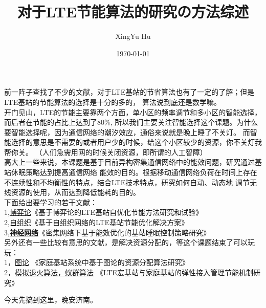 \documentclass{article}
\author{XingYu Hu}
\title{对于LTE节能算法的研究の方法综述}
\date{\today}
\begin{document}
\maketitle
前一阵子查找了不少的文献，对于LTE基站的节省算法也有了一定的了解；但是LTE基站的节能算法的选择是十分的多的，
算法说到底还是数学嘛。\\

开门见山，LTE的节能主要靠两个方面，单小区的频率调节和多小区的智能选择，而后者在节能的占比上达到了80\%,
所以我们主要关注智能选择这个课题。为什么要智能选择呢，因为通信网络的潮汐效应，通俗来说就是晚上睡了不关灯。
而智能选择的意思是不需要的或者用户少的时候，给这个小区较少的资源，你不关灯我帮你关。
（人们急需用网的时候关闭资源，即所谓的人工智障）\\


高大上一些来说，本课题是基于目前异构密集通信网络中的能效问题，研究通过基站休眠策略达到提高通信网络
能效的目的。根据移动通信网络负荷在时间上存在不连续性和不均衡性的特点，结合LTE技术特点，研究如何自动、动态地
调节无线资源的使用，从而达到降低能耗的目的。\\

下面给出要学习的若干文献：\\
1,\underline{博弈论}《基于博弈论的LTE基站自优化节能方法研究和试验》\\
2,\underline{自组织}《基于自组织网络的LTE基站节能优化解决方案》\\
3,\underline{\textbf{神经网络}}《密集网络下基于能效优化的基站睡眠控制策略研究》\\

另外还有一些比较有意思的文献，是解决资源分配的，等这个课题结束了可以玩玩：\\
1，\underline{图论} 《家庭基站系统中基于图论的资源分配算法研究》 \\
2，\underline{模拟退火算法，蚁群算法} 《LTE宏基站与家庭基站的弹性接入管理节能机制研究》

今天先搞到这里，晚安济南。
\end{document}
